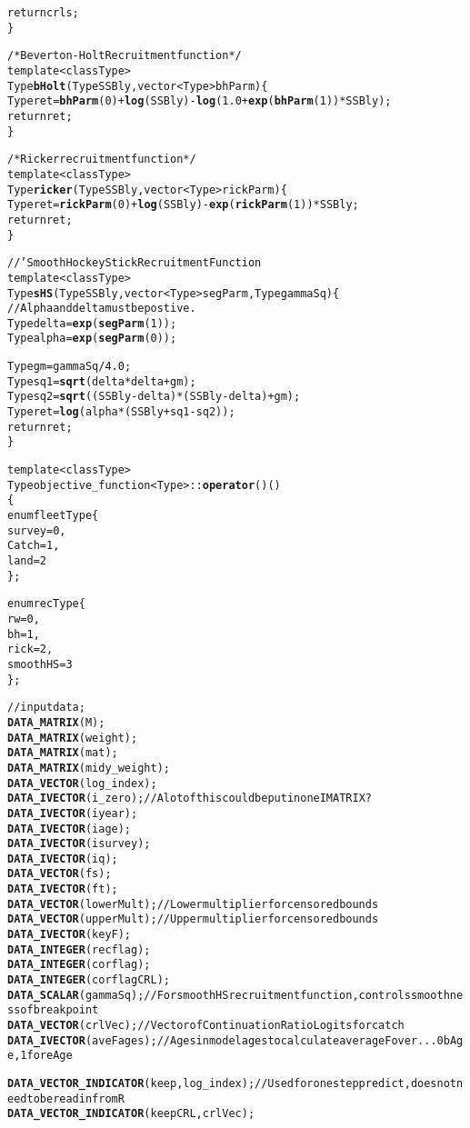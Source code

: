 \documentclass[11pt]{article}\usepackage[]{graphicx}\usepackage[]{color}
\makeatletter
\newcommand{\hlkwd}[1]{\textcolor[rgb]{0.737,0.353,0.396}{\textbf{#1}}}%
\newenvironment{kframe}{%
 \def\at@end@of@kframe{}%
 \ifinner\ifhmode%
  \def\at@end@of@kframe{\end{minipage}}%
  \begin{minipage}{\columnwidth}%
 \fi\fi%
 \def\FrameCommand##1{\hskip\@totalleftmargin \hskip-\fboxsep
 \colorbox{shadecolor}{##1}\hskip-\fboxsep
     \hskip-\linewidth \hskip-\@totalleftmargin \hskip\columnwidth}%
 \MakeFramed {\advance\hsize-\width
   \@totalleftmargin\z@ \linewidth\hsize
   \@setminipage}}%
 {\par\unskip\endMakeFramed%
 \at@end@of@kframe}
\newenvironment{knitrout}{}{} %
\makeatother
\begin{document}
\begin{appendices}
\begin{knitrout}
\begin{kframe}
\begin{alltt}
return crls;
\}

/*Beverton-Holt Recruitment function*/
template<class Type>
Type \hlkwd{bHolt}(Type SSBly,vector <Type> bhParm)\{
Type ret = \hlkwd{bhParm}(0) + \hlkwd{log}(SSBly) -\hlkwd{log}(1.0+\hlkwd{exp}(\hlkwd{bhParm}(1))*SSBly);
return ret;
\}

/*Ricker recruitment function*/
template<class Type>
Type \hlkwd{ricker}(Type SSBly,vector <Type> rickParm)\{
Type ret = \hlkwd{rickParm}(0) + \hlkwd{log}(SSBly) - \hlkwd{exp}(\hlkwd{rickParm}(1))*SSBly;
return ret;
\}

//' Smooth Hockey Stick Recruitment Function
template<class Type>
Type \hlkwd{sHS}(Type SSBly,vector <Type> segParm,Type gammaSq)\{
//Alpha and delta must be postive.
Type delta = \hlkwd{exp}(\hlkwd{segParm}(1));
Type alpha = \hlkwd{exp}(\hlkwd{segParm}(0));

Type gm = gammaSq/4.0;
Type sq1 = \hlkwd{sqrt}(delta*delta + gm);
Type sq2 = \hlkwd{sqrt}((SSBly-delta)*(SSBly-delta) +gm);
Type ret = \hlkwd{log}(alpha*(SSBly+sq1-sq2));
return ret;
\}


template<class Type>
Type objective_function<Type>::\hlkwd{operator}() ()
\{
enum fleetType \{
  survey = 0,
  Catch = 1,
  land = 2
\};

enum recType \{
  rw = 0,
  bh = 1,
  rick = 2,
  smoothHS = 3
\};
  

// input data;  
\hlkwd{DATA_MATRIX}(M);
\hlkwd{DATA_MATRIX}(weight); 
\hlkwd{DATA_MATRIX}(mat); 
\hlkwd{DATA_MATRIX}(midy_weight);
\hlkwd{DATA_VECTOR}(log_index);
\hlkwd{DATA_IVECTOR}(i_zero); //A lot of this could be put in one IMATRIX?
\hlkwd{DATA_IVECTOR}(iyear);
\hlkwd{DATA_IVECTOR}(iage);
\hlkwd{DATA_IVECTOR}(isurvey);
\hlkwd{DATA_IVECTOR}(iq);
\hlkwd{DATA_VECTOR}(fs);
\hlkwd{DATA_IVECTOR}(ft);
\hlkwd{DATA_VECTOR}(lowerMult); //Lower multiplier for censored bounds
\hlkwd{DATA_VECTOR}(upperMult); //Upper multiplier for censored bounds
\hlkwd{DATA_IVECTOR}(keyF);
\hlkwd{DATA_INTEGER}(recflag);
\hlkwd{DATA_INTEGER}(corflag);
\hlkwd{DATA_INTEGER}(corflagCRL);
\hlkwd{DATA_SCALAR}(gammaSq); //For smoothHS recruitment function, controls smoothness of breakpoint
\hlkwd{DATA_VECTOR}(crlVec); //Vector of Continuation Ratio Logits for catch
\hlkwd{DATA_IVECTOR}(aveFages); //Ages in model ages to calculate average F over...0 bAge, 1 for eAge


\hlkwd{DATA_VECTOR_INDICATOR}(keep,log_index); //Used for one step predict, does not need to be read in from R
\hlkwd{DATA_VECTOR_INDICATOR}(keepCRL,crlVec);


\end{alltt}
\end{kframe}
\end{knitrout}
\end{appendices}
\end{document}
